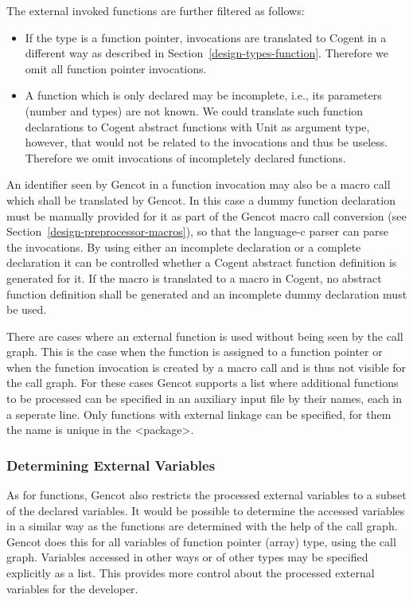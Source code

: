 The external invoked functions are further filtered as follows:
\begin{itemize}
\item If the type is a function pointer, invocations are translated to Cogent in a different way as 
described in Section~\ref{design-types-function}. Therefore we omit all function pointer invocations.
\item A function which is only declared may be incomplete, i.e., its parameters (number and types) are not known. 
We could translate such function declarations to Cogent abstract functions with Unit as argument type, however,
that would not be related to the invocations and thus be useless. Therefore we omit invocations
of incompletely declared functions.
\end{itemize}

An identifier seen by Gencot in a function invocation may also be a macro call which shall be translated by Gencot. 
In this case a dummy function declaration must be manually provided for it as part of the Gencot macro call conversion
(see Section~\ref{design-preprocessor-macros}), so that the language-c parser can parse the invocations. By 
using either an incomplete declaration or a complete declaration it can be controlled whether a Cogent abstract 
function definition is generated for it. If the macro is translated to a macro in Cogent, no abstract function
definition shall be generated and an incomplete dummy declaration must be used.

There are cases where an external function is used without being seen by the call graph. This is the case when
the function is assigned to a function pointer or when the function invocation is created by a macro call and
is thus not visible for the call graph. For these cases Gencot supports a list where additional functions
to be processed can be specified in an auxiliary input file by their names, each in a seperate line. Only
functions with external linkage can be specified, for them the name is unique in the <package>.

\subsubsection{Determining External Variables}

As for functions, Gencot also restricts the processed external variables to a subset of the declared variables.
It would be possible to determine the accessed variables in a similar way as the functions are determined with
the help of the call graph. Gencot does this for all variables of function pointer (array) type, using the 
call graph. Variables accessed in other ways or of other types may be specified explicitly as a list. This
provides more control about the processed external variables for the developer.

